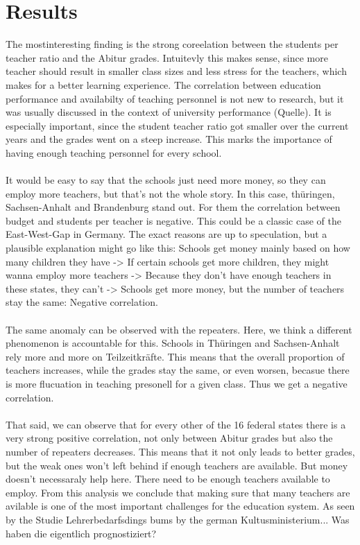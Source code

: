 \section*{Results}
The mostinteresting finding is the strong coreelation between the students per teacher ratio and the Abitur grades. Intuitevly this makes sense, since more teacher should result in smaller class sizes and less stress for the teachers, which makes for a better learning experience. The correlation between education performance and availabilty of teaching personnel is not new to research, but it was usually discussed in the context of university performance (Quelle). It is especially important, since the student teacher ratio got smaller over the current years and the grades went on a steep increase. This marks the importance of having enough teaching personnel for every school.\\\\
It would be easy to say that the schools just need more money, so they can employ more teachers, but that's not the whole story. In this case, thüringen, Sachsen-Anhalt and Brandenburg stand out. For them the correlation between budget and students per teacher is negative. This could be a classic case of the East-West-Gap in Germany. The exact reasons are up to speculation, but a plausible explanation might go like this: Schools get money mainly based on how many children they have -> If certain schools get more children, they might wanna employ more teachers -> Because they don't have enough teachers in these states, they can't -> Schools get more money, but the number of teachers stay the same: Negative correlation.\\\\
The same anomaly can be observed with the repeaters. Here, we think a different phenomenon is accountable for this. Schools in Thüringen and Sachsen-Anhalt rely more and more on Teilzeitkräfte. This means that the overall proportion of teachers increases, while the grades stay the same, or even worsen, becasue there is more flucuation in teaching presonell for a given class. Thus we get a negative correlation.\\\\
That said, we can observe that for every other of the 16 federal states there is a very strong positive correlation, not only between Abitur grades but also the number of repeaters decreases. This means that it not only leads to better grades, but the weak ones won't left behind if enough teachers are available. But money doesn't necessaraly help here. There need to be enough teachers available to employ. From this analysis we conclude that making sure that many teachers are avilable is one of the most important challenges for the education system. As seen by the Studie Lehrerbedarfsdings bums by the german Kultusministerium... Was haben die eigentlich prognostiziert?
